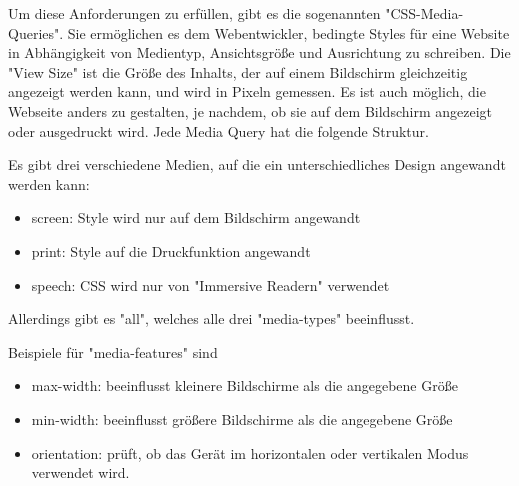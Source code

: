 
Um diese Anforderungen zu erfüllen, gibt es die sogenannten "CSS-Media-Queries". Sie ermöglichen es dem Webentwickler, bedingte Styles für eine Website in Abhängigkeit von Medientyp, Ansichtsgröße und Ausrichtung zu schreiben. Die "View Size" ist die Größe des Inhalts, der auf einem Bildschirm gleichzeitig angezeigt werden kann, und wird in Pixeln gemessen. Es ist auch möglich, die Webseite anders zu gestalten, je nachdem, ob sie auf dem Bildschirm angezeigt oder ausgedruckt wird. Jede Media Query hat die folgende Struktur. 


Es gibt drei verschiedene Medien, auf die ein unterschiedliches Design angewandt werden kann: 
\begin{itemize}
    \item screen: Style wird nur auf dem Bildschirm angewandt
    \item print: Style auf die Druckfunktion angewandt 
    \item speech: CSS wird nur von "Immersive Readern" verwendet
\end{itemize}
Allerdings gibt es "all", welches alle drei "media-types" beeinflusst. \cite{w3MediaQueries}

Beispiele für "media-features" sind

\begin{itemize}
    \item max-width: beeinflusst kleinere Bildschirme als die angegebene Größe
    \item min-width: beeinflusst größere Bildschirme als die angegebene Größe 
    \item orientation: prüft, ob das Gerät im horizontalen oder vertikalen Modus verwendet wird.
\end{itemize}
